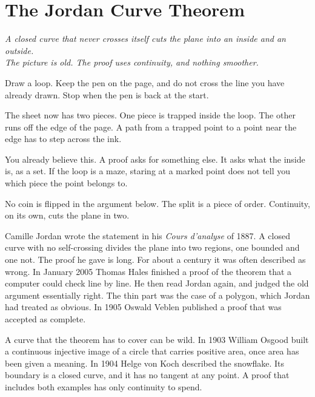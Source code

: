 \chapter{The Jordan Curve Theorem}\label{ch:jordan}

\begin{center}\itshape
A closed curve that never crosses itself cuts the plane into an inside and an outside.\\
The picture is old. The proof uses continuity, and nothing smoother.
\end{center}

Draw a loop. Keep the pen on the page, and do not cross the line you have already drawn. Stop when the pen is back at the start.

The sheet now has two pieces. One piece is trapped inside the loop. The other runs off the edge of the page. A path from a trapped point to a point near the edge has to step across the ink.

You already believe this. A proof asks for something else. It asks what the inside is, as a set. If the loop is a maze, staring at a marked point does not tell you which piece the point belongs to.

No coin is flipped in the argument below. The split is a piece of order. Continuity, on its own, cuts the plane in two.

Camille Jordan wrote the statement in his \emph{Cours d'analyse} of 1887. A closed curve with no self-crossing divides the plane into two regions, one bounded and one not. The proof he gave is long. For about a century it was often described as wrong. In January 2005 Thomas Hales finished a proof of the theorem that a computer could check line by line. He then read Jordan again, and judged the old argument essentially right. The thin part was the case of a polygon, which Jordan had treated as obvious. In 1905 Oswald Veblen published a proof that was accepted as complete.


A curve that the theorem has to cover can be wild. In 1903 William Osgood built a continuous injective image of a circle that carries positive area, once area has been given a meaning. In 1904 Helge von Koch described the snowflake. Its boundary is a closed curve, and it has no tangent at any point. A proof that includes both examples has only continuity to spend.

